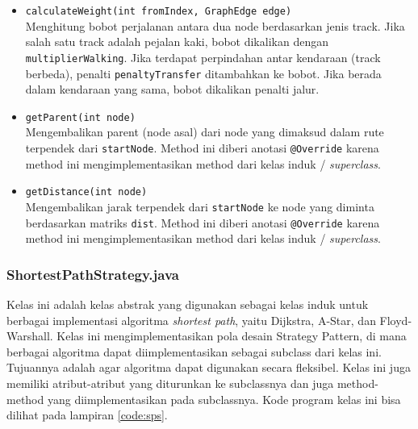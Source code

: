 \begin{itemize}
\begin{itemize}
        \item \texttt{calculateWeight(int fromIndex, GraphEdge edge)}
        \\ Menghitung bobot perjalanan antara dua node berdasarkan jenis track. Jika salah satu track adalah pejalan kaki, bobot dikalikan dengan \texttt{multiplierWalking}. Jika terdapat perpindahan antar kendaraan (track berbeda), penalti \texttt{penaltyTransfer} ditambahkan ke bobot. Jika berada dalam kendaraan yang sama, bobot dikalikan penalti jalur.

        \item \texttt{getParent(int node)}
        \\ Mengembalikan parent (node asal) dari node yang dimaksud dalam rute terpendek dari \texttt{startNode}. Method ini diberi anotasi \texttt{@Override} karena method ini mengimplementasikan method dari kelas induk / \textit{superclass}.

        \item \texttt{getDistance(int node)}
        \\ Mengembalikan jarak terpendek dari \texttt{startNode} ke node yang diminta berdasarkan matriks \texttt{dist}. Method ini diberi anotasi \texttt{@Override} karena method ini mengimplementasikan method dari kelas induk / \textit{superclass}.
    \end{itemize}
\end{itemize}

\subsubsection{ShortestPathStrategy.java}
Kelas ini adalah kelas abstrak yang digunakan sebagai kelas induk untuk berbagai implementasi algoritma \textit{shortest path}, yaitu Dijkstra, A-Star, dan Floyd-Warshall. Kelas ini mengimplementasikan pola desain Strategy Pattern, di mana berbagai algoritma dapat diimplementasikan sebagai subclass dari kelas ini. Tujuannya adalah agar algoritma dapat digunakan secara fleksibel. Kelas ini juga memiliki atribut-atribut yang diturunkan ke subclassnya dan juga method-method yang diimplementasikan pada subclassnya. Kode program kelas ini bisa dilihat pada lampiran \ref{code:sps}.

